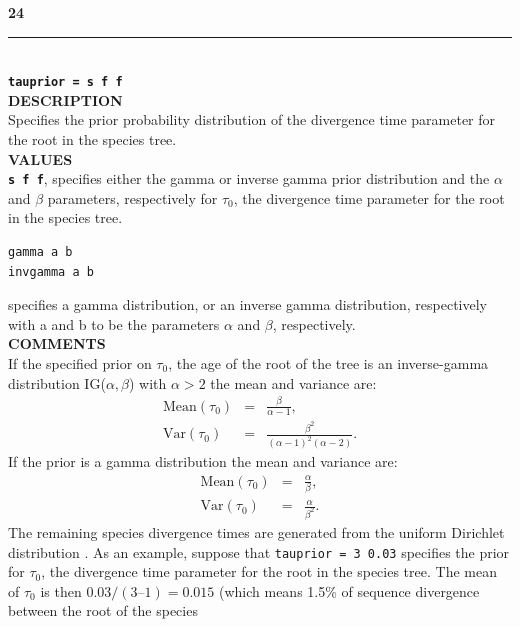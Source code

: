 \documentclass{book}
\numberwithin{equation}{section} \renewcommand{\baselinestretch}{0.55}
\begin{document}
\textbf{{\large 24}} \\
\noindent\rule{\textwidth}{0.8pt} \\
\textbf{{\Large \texttt{tauprior = s f f}}} \vspace{5pt}\\
\textbf{DESCRIPTION} \vspace{5pt}\\
Specifies the prior probability distribution of the divergence time
parameter for the root in the species tree.
\vspace{5pt}\\
\textbf{VALUES} \vspace{5pt}\\
\textbf{\texttt{s f f}}, specifies either the gamma or inverse gamma prior
distribution and the $\alpha$ and $\beta$ parameters,
respectively for $\tau_0$, the divergence time parameter for the root in the species
tree.
\begin{verbatim}
gamma a b
invgamma a b
\end{verbatim}
specifies a gamma distribution, or an inverse gamma distribution, respectively with
a and b to be the parameters $\alpha$ and $\beta$, respectively.
\vspace{5pt}\\
\textbf{COMMENTS} \vspace{5pt}\\
If the specified prior on $\tau_0$, the age of the root of the tree is an
inverse-gamma distribution IG($\alpha, \beta$) with $\alpha > 2$ the
mean and variance are:
\begin{eqnarray}
  \textrm{Mean}(\tau_0) & = & \frac{\beta}{\alpha - 1}, \nonumber \\
  \textrm{Var}(\tau_0) & = & \frac{\beta^2}{(\alpha - 1)^2 (\alpha - 2)}. \nonumber
\end{eqnarray}
If the prior is a gamma distribution the mean and variance are:
\begin{eqnarray}
  \textrm{Mean}(\tau_0) & = & \frac{\alpha}{\beta}, \nonumber \\
  \textrm{Var}(\tau_0) & = & \frac{\alpha}{\beta^2}. \nonumber
\end{eqnarray}
The remaining species divergence times are generated from the uniform
Dirichlet distribution \citep[][eq.~2]{Yang2010}.  As an example,
suppose that \texttt{tauprior = 3 0.03} specifies the prior for
$\tau_0$, the divergence time parameter for the root in the species
tree.  The mean of $\tau_0$ is then $0.03/(3 – 1) = 0.015$ (which
means 1.5\% of sequence divergence between the root of the species
\end{document}
